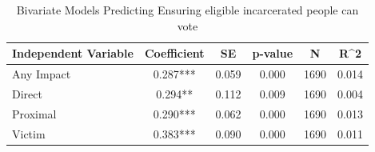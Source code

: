 \begin{table}

\caption{\label{tab:tab:q23_7_rev_bivariate}Bivariate Models Predicting Ensuring eligible incarcerated people can vote}
\centering
\begin{tabular}[t]{lccccc}
\toprule
Independent Variable & Coefficient & SE & p-value & N & R\textasciicircum{}2\\
\midrule
Any Impact & 0.287*** & 0.059 & 0.000 & 1690 & 0.014\\
Direct & 0.294** & 0.112 & 0.009 & 1690 & 0.004\\
Proximal & 0.290*** & 0.062 & 0.000 & 1690 & 0.013\\
Victim & 0.383*** & 0.090 & 0.000 & 1690 & 0.011\\
\bottomrule
\end{tabular}
\end{table}

